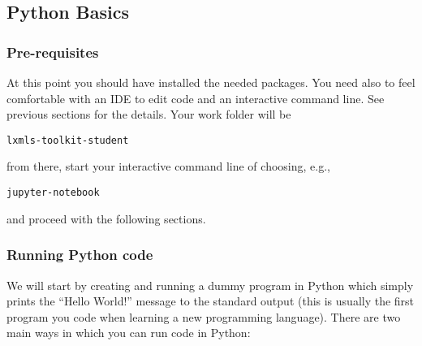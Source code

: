 \subsection{Python Basics}

\subsubsection{Pre-requisites}

At this point you should have installed the needed packages. You need also to feel comfortable with an IDE to edit code and an interactive command line. See previous sections for the details. Your work folder will be

\begin{verbatim}
lxmls-toolkit-student
\end{verbatim}

\noindent from there, start your interactive command line of choosing, e.g.,

\begin{verbatim}
jupyter-notebook
\end{verbatim}

\noindent and proceed with the following sections.

\subsubsection{Running Python code}

We will start by creating and running a dummy program in Python which simply
prints the ``Hello World!'' message to the standard output (this is usually the
first program you code when learning a new programming language). There are two
main ways in which you can run code in Python: 

